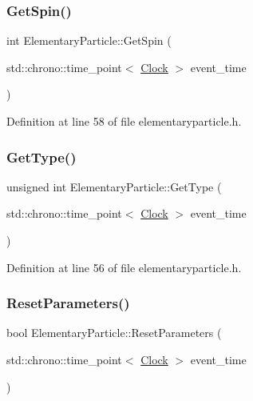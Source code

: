 \subsubsection{\texorpdfstring{Get\+Spin()}{GetSpin()}}
{\footnotesize\ttfamily int Elementary\+Particle\+::\+Get\+Spin (\begin{DoxyParamCaption}\item[{std\+::chrono\+::time\+\_\+point$<$ \hyperlink{universe_8h_a0ef8d951d1ca5ab3cfaf7ab4c7a6fd80}{Clock} $>$}]{event\+\_\+time }\end{DoxyParamCaption})\hspace{0.3cm}{\ttfamily [inline]}}



Definition at line 58 of file elementaryparticle.\+h.

\mbox{\label{class_elementary_particle_a63fe7df86d2fba4a64a69dfa5757e94e}} 
\subsubsection{\texorpdfstring{Get\+Type()}{GetType()}}
{\footnotesize\ttfamily unsigned int Elementary\+Particle\+::\+Get\+Type (\begin{DoxyParamCaption}\item[{std\+::chrono\+::time\+\_\+point$<$ \hyperlink{universe_8h_a0ef8d951d1ca5ab3cfaf7ab4c7a6fd80}{Clock} $>$}]{event\+\_\+time }\end{DoxyParamCaption})\hspace{0.3cm}{\ttfamily [inline]}}



Definition at line 56 of file elementaryparticle.\+h.

\mbox{\label{class_elementary_particle_ac0f85f34bdfc1d42324201eb7c38e85e}} 
\subsubsection{\texorpdfstring{Reset\+Parameters()}{ResetParameters()}}
{\footnotesize\ttfamily bool Elementary\+Particle\+::\+Reset\+Parameters (\begin{DoxyParamCaption}\item[{std\+::chrono\+::time\+\_\+point$<$ \hyperlink{universe_8h_a0ef8d951d1ca5ab3cfaf7ab4c7a6fd80}{Clock} $>$}]{event\+\_\+time }\end{DoxyParamCaption})}



